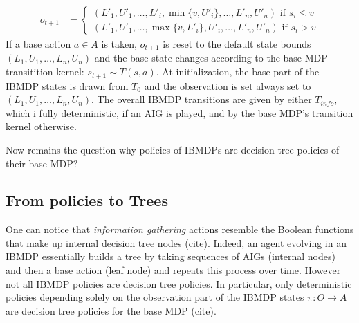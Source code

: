 \begin{definition}
\begin{itemize}
\begin{align*}
    o_{t+1} &= \begin{cases}
        (L'_1, U'_1, \dots , L'_i, \min\{v, U'_i\}, \dots , L'_n, U'_n) \text{ if } s_i \leq v\\
        (L'_1, U'_1, \dots , \max\{v, L'_i\}, U'_i, \dots , L'_n, U'_n) \text{ if } s_i > v
    \end{cases}
\end{align*}
If a base action $a\in A$ is taken, $o_{t+1}$ is reset to the default state bounds $(L_1, U_1,\dots, L_n, U_n)$ and the base state changes according to the base MDP transitition kernel: $s_{t+1}\sim T(s, a)$.
At initialization, the base part of the IBMDP states is drawn from $T_0$ and the observation is set always set to $(L_1, U_1,\dots, L_n, U_n)$.
The overall IBMDP transitions are given by either $T_{info}$, which i fully deterministic, if an AIG is played, and by the base MDP's transition kernel otherwise.
\end{itemize}
\end{definition}
Now remains the question why policies of IBMDPs are decision tree policies of their base MDP? 
\subsection{From policies to Trees}
One can notice that \textit{information gathering} actions resemble the Boolean functions that make up internal decision tree nodes (cite). 
Indeed, an agent evolving in an IBMDP essentially builds a tree by taking sequences of AIGs (internal nodes) and then a base action (leaf node) and repeats this process over time.
However not all IBMDP policies are decision tree policies. In particular, only deterministic policies depending solely on the observation part of the IBMDP states $\pi: O \rightarrow A$ are decision tree policies for the base MDP (cite).

